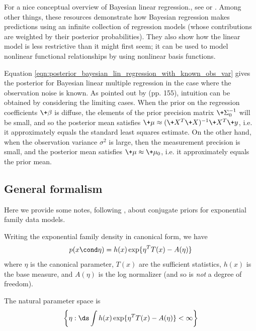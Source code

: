 \documentclass{article} %
\begin{document}
\begin{remark}
For a nice conceptual overview of Bayesian linear regression., see \cite{groseeXXXXbayesian} or \cite{bishop2006pattern}.   Among other things, these resources demonstrate how Bayesian regression makes predictions using an infinite collection of regression models (whose contributions are weighted by their posterior probabilities).  They also show how the linear model is less restrictive than it might first seem;  it can be used to model nonlinear functional relationships by using nonlinear basis functions. 
\end{remark}

\begin{remark}{}
Equation \eqref{eqn:posterior_bayesian_lin_regression_with_known_obs_var}
gives the posterior for Bayesian linear multiple regression in the case where the observation noise is known.    As pointed out by \cite{hoff2009first} (pp. 155),  intuition can be obtained by considering the limiting cases.  When the prior on the regression coefficients $\+\beta$ is diffuse,  the elements of the prior precision matrix $\+\Sigma_0^{-1}$ will be small,  and so the posterior mean satisfies
$\+\mu \approx ( \+X^T \+X)^{-1} \+X^T \+y$,  i.e.  it approximately equals the standard least squares estimate.   On the other hand,   when the observation variance $\sigma^2$ is large,  then the measurement precision is small, and the posterior mean satisfies $\+\mu \approx \+\mu_0$,  i.e.  it approximately equals the prior mean.
\end{remark}


\subsection{General formalism} \label{sec:ef_general_formalism}
Here we provide some notes, following \cite{jordan_ef}, about conjugate priors for exponential family data models. 

Writing the exponential family density in canonical form, we have
\[ p(x \cond \eta) = h(x) \exp \{ \eta^T T(x) - A(\eta) \} \]
where $\eta$ is the canonical parameter, $T(x)$ are the sufficient statistics,  $h(x)$ is the base measure, and $A(\eta)$ is the log normalizer (and so is \textit{not} a degree of freedom). 

The natural parameter space is 
\[  \bigg\{\eta : \ds\int h(x) \exp \{ \eta^T T(x) - A(\eta) \} < \infty \bigg \}\]
\end{document}
